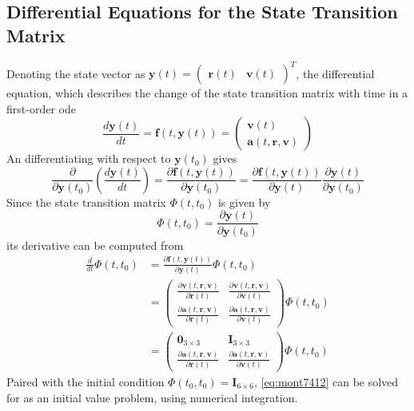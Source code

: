 \subsection{Differential Equations for the State Transition Matrix}\label{ssec:pod-state-transition-ode}
Denoting the state vector as $\bm{y}(t) = \begin{pmatrix}\bm{r}(t) & \bm{v}(t) \end{pmatrix}^{T}$, 
the differential equation, which describes the change of the state transition matrix 
with time in a first-order \gls{ode} 
\begin{equation}\label{eq:mont738}
    \frac{d \bm{y}(t)}{d t} = \bm{f}(t,\bm{y}(t)) = 
        \begin{pmatrix}\bm{v}(t)\\\bm{a}(t,\bm{r},\bm{v})\end{pmatrix}
\end{equation}
An differentiating with respect to $\bm{y}(t_0)$ gives
\begin{equation}
    \frac{\partial}{\partial \bm{y}(t_0)} \left( \frac{d \bm{y}(t)}{d t} \right) 
        = \frac{\partial \bm{f}(t,\bm{y}(t))}{\partial \bm{y}(t_0)} 
        = \frac{\partial \bm{f}(t,\bm{y}(t))}{\partial \bm{y}(t)}\frac{\partial \bm{y}(t)}{\partial \bm{y}(t_0)}
\end{equation}
Since the state transition matrix $\Phi (t,t_0)$ is given by
\begin{equation}\label{eq:mont740}
    \Phi (t,t_0) = \frac{\partial \bm{y}(t)}{\partial \bm{y}(t_0)}
\end{equation}
its derivative can be computed from
\begin{equation}\label{eq:mont7412}
    \begin{aligned}
        \frac{d}{dt} \Phi (t,t_0) & = \frac{\partial \bm{f}(t,\bm{y}(t))}{\partial \bm{y}(t)} 
        \Phi (t,t_0) \\
        &= \begin{pmatrix}
            \frac{\partial \bm{v}(t,\bm{r}, \bm{v})}{\partial \bm{r}(t)} &
            \frac{\partial \bm{v}(t,\bm{r}, \bm{v})}{\partial \bm{v}(t)} \\
            \frac{\partial \bm{a}(t,\bm{r}, \bm{v})}{\partial \bm{r}(t)} &
            \frac{\partial \bm{a}(t,\bm{r}, \bm{v})}{\partial \bm{v}(t)}
        \end{pmatrix} \Phi (t,t_0) \\
        &= \begin{pmatrix}
            \bm{0}_{3 \times 3} & \bm{I}_{3 \times 3} \\
            \frac{\partial \bm{a}(t,\bm{r}, \bm{v})}{\partial \bm{r}(t)} &
            \frac{\partial \bm{a}(t,\bm{r}, \bm{v})}{\partial \bm{v}(t)}
        \end{pmatrix} \Phi (t,t_0)
    \end{aligned}
\end{equation}
Paired with the initial condition $\Phi (t_0,t_0) = \bm{I}_{6 \times 6}$, 
\autoref{eq:mont7412} can be solved for as an initial value problem, using 
numerical integration.

